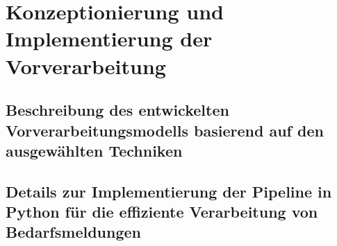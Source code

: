 \chapter{Konzeptionierung und Implementierung der Vorverarbeitung}
\label{chap:implementierung}

\section{Beschreibung des entwickelten Vorverarbeitungsmodells basierend auf den ausgewählten Techniken}

\section{Details zur Implementierung der Pipeline in Python für die effiziente Verarbeitung von Bedarfsmeldungen}
\newpage
